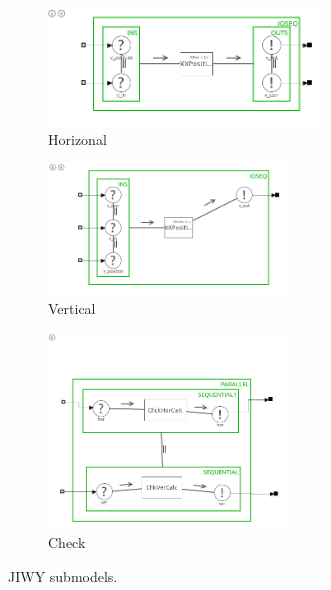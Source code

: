\documentclass[a4paper,twoside,11pt]{article}
\begin{document}
\begin{figure}[ht]
	\begin{subfigure}{\textwidth}
		\centering
		\includegraphics[width=0.8\textwidth]{./img/jiwy-jiwy-hor.png}
		\caption{Horizonal}
	\end{subfigure}
	\begin{subfigure}{\textwidth}
		\centering
		\includegraphics[width=0.7\textwidth]{./img/jiwy-jiwy-ver.png}
		\caption{Vertical}
	\end{subfigure}
	\begin{subfigure}{\textwidth}
		\centering
		\includegraphics[width=0.7\textwidth]{./img/jiwy-jiwy-check.png}
		\caption{Check}
		\label{fig:jiwysubmodel-check}
	\end{subfigure}
	\caption{JIWY submodels.}
	\label{fig:jiwysubmodel}
\end{figure}
\end{document}
